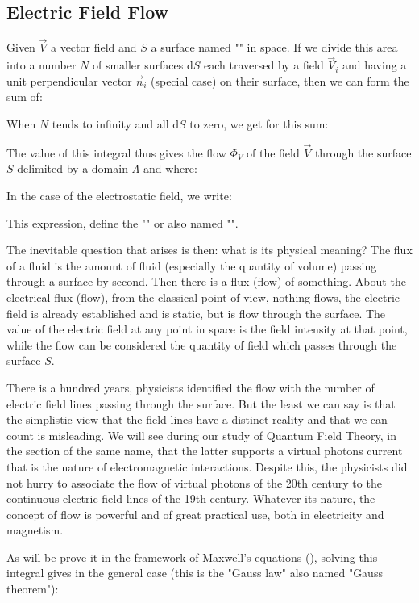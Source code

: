 	\subsection{Electric Field Flow}
	Given $\vec{V}$ a vector field and $S$ a surface named "" in space. If we divide this area into a number $N$ of smaller surfaces $\mathrm{d}S$ each traversed by a field $\vec{V}_i$ and having a unit perpendicular vector $\vec{n}_i$ (special case) on their surface, then we can form the sum of:
	
	When $N$ tends to infinity and all $\mathrm{d}S$ to zero, we get for this sum:
	
	The value of this integral thus gives the flow $\Phi_V$ of the field $\vec{V}$ through the surface $S$ delimited by a domain $\Lambda$ and where:
	
	In the case of the electrostatic field, we write:
	
	This expression, define the "" or also named "".	
	
	The inevitable question that arises is then: what is its physical meaning? The flux of a fluid is the amount of fluid (especially the quantity of volume) passing through a surface by second. Then there is a flux (flow) of something. About the electrical flux (flow), from the classical point of view, nothing flows, the electric field is already established and is static, but is flow through the surface. The value of the electric field at any point in space is the field intensity at that point, while the flow can be considered the quantity of field which passes through the surface $S$. 

	There is a hundred years, physicists identified the flow with the number of electric field lines passing through the surface. But the least we can say is that the simplistic view that the field lines have a distinct reality and that we can count is misleading. We will see during our study of Quantum Field Theory, in the section of the same name, that the latter supports a virtual photons current that is the nature of electromagnetic interactions. Despite this, the physicists did not hurry to associate the flow of virtual photons of the 20th century to the continuous electric field lines of the 19th century. Whatever its nature, the concept of flow is powerful and of great practical use, both in electricity and magnetism.
	
	As will be prove it in the framework of Maxwell's equations (), solving this integral gives in the general case (this is the "Gauss law" also named "Gauss theorem"):
	
